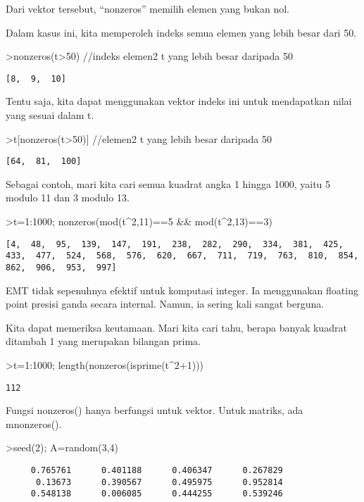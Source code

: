 \documentclass[
]{book}
\begin{document}
Dari vektor tersebut, ``nonzeros'' memilih elemen yang bukan nol.

Dalam kasus ini, kita memperoleh indeks semua elemen yang lebih besar dari 50.

\textgreater nonzeros(t\textgreater50) //indeks elemen2 t yang lebih besar daripada 50

\begin{verbatim}
[8,  9,  10]
\end{verbatim}

Tentu saja, kita dapat menggunakan vektor indeks ini untuk mendapatkan nilai yang sesuai dalam t.

\textgreater t{[}nonzeros(t\textgreater50){]} //elemen2 t yang lebih besar daripada 50

\begin{verbatim}
[64,  81,  100]
\end{verbatim}

Sebagai contoh, mari kita cari semua kuadrat angka 1 hingga 1000, yaitu 5 modulo 11 dan 3 modulo 13.

\textgreater t=1:1000; nonzeros(mod(t\^{}2,11)==5 \&\& mod(t\^{}2,13)==3)

\begin{verbatim}
[4,  48,  95,  139,  147,  191,  238,  282,  290,  334,  381,  425,
433,  477,  524,  568,  576,  620,  667,  711,  719,  763,  810,  854,
862,  906,  953,  997]
\end{verbatim}

EMT tidak sepenuhnya efektif untuk komputasi integer. Ia menggunakan floating point presisi ganda secara internal. Namun, ia sering kali sangat berguna.

Kita dapat memeriksa keutamaan. Mari kita cari tahu, berapa banyak kuadrat ditambah 1 yang merupakan bilangan prima.

\textgreater t=1:1000; length(nonzeros(isprime(t\^{}2+1)))

\begin{verbatim}
112
\end{verbatim}

Fungsi nonzeros() hanya berfungsi untuk vektor. Untuk matriks, ada mnonzeros().

\textgreater seed(2); A=random(3,4)

\begin{verbatim}
     0.765761      0.401188      0.406347      0.267829 
      0.13673      0.390567      0.495975      0.952814 
     0.548138      0.006085      0.444255      0.539246 
\end{verbatim}
\end{document}
